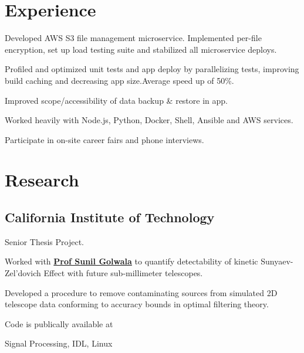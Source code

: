 \documentclass[]{deedy-resume-openfont}
\begin{document}
\hfill
\begin{minipage}[t]{0.66\textwidth}


\section{Experience}

\vspace{\topsep} %
\begin{tightemize}
    \item Developed AWS S3 file management microservice. Implemented per-file
        encryption, set up load testing suite and stabilized all microservice
        deploys.
    \item Profiled and optimized unit tests and app deploy by parallelizing
        tests, improving build caching and decreasing app size.\@ Average speed
        up of 50\%.
    \item Improved scope/accessibility of data backup \& restore in app.
    \item Worked heavily with Node.js, Python, Docker, Shell, Ansible and AWS
        services.
    \item Participate in on-site career fairs and phone interviews.
\end{tightemize}
\sectionsep


\section{Research}
\subsection{California Institute of Technology}
\begin{tightemize}
    \item Senior Thesis Project.
    \item Worked with \textbf{\href{TODO}{Prof Sunil Golwala}} to quantify
        detectability of kinetic Sunyaev-Zel'dovich Effect with future
        sub-millimeter telescopes.
    \item Developed a procedure to remove contaminating sources from
        simulated 2D telescope data conforming to accuracy bounds in optimal
        filtering theory.
    \item Code is publically available at %
    \item Signal Processing, IDL, Linux
\end{tightemize}
\sectionsep


\end{minipage}
\end{document}
